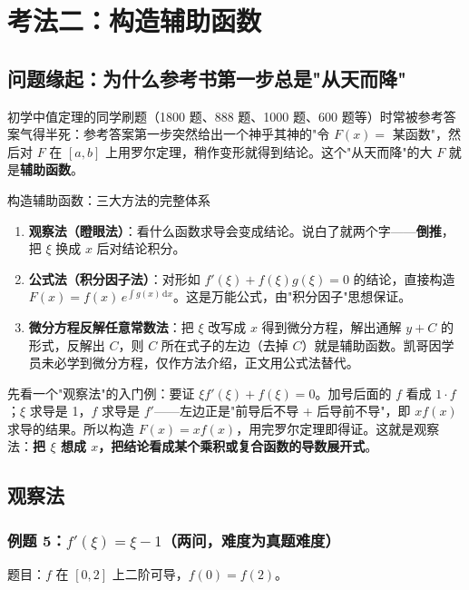 \documentclass[a4paper]{article}
\begin{document}
\section{考法二：构造辅助函数}

\subsection{问题缘起：为什么参考书第一步总是"从天而降"}

初学中值定理的同学刷题（1800 题、888 题、1000 题、600 题等）时常被参考答案气得半死：参考答案第一步突然给出一个神乎其神的"令 $F(x)=$ 某函数"，然后对 $F$ 在 $[a,b]$ 上用罗尔定理，稍作变形就得到结论。这个"从天而降"的大 $F$ 就是\textbf{辅助函数}。

\begin{importantbox}{构造辅助函数：三大方法的完整体系}
\begin{enumerate}
\item \textbf{观察法（瞪眼法）}：看什么函数求导会变成结论。说白了就两个字——\textbf{倒推}，把 $\xi$ 换成 $x$ 后对结论积分。
\item \textbf{公式法（积分因子法）}：对形如 $f'(\xi)+f(\xi)g(\xi)=0$ 的结论，直接构造 $F(x)=f(x)\,e^{\int g(x)\,\mathrm{d}x}$。这是万能公式，由"积分因子"思想保证。
\item \textbf{微分方程反解任意常数法}：把 $\xi$ 改写成 $x$ 得到微分方程，解出通解 $y+C$ 的形式，反解出 $C$，则 $C$ 所在式子的左边（去掉 $C$）就是辅助函数。凯哥因学员未必学到微分方程，仅作方法介绍，正文用公式法替代。
\end{enumerate}
\end{importantbox}

先看一个"观察法"的入门例：要证 $\xi f'(\xi)+f(\xi)=0$。加号后面的 $f$ 看成 $1\cdot f$；$\xi$ 求导是 1，$f$ 求导是 $f'$——左边正是"前导后不导 + 后导前不导"，即 $xf(x)$ 求导的结果。所以构造 $F(x)=xf(x)$，用完罗尔定理即得证。这就是观察法：\textbf{把 $\xi$ 想成 $x$，把结论看成某个乘积或复合函数的导数展开式}。

\subsection{观察法}

\subsubsection{例题 5：$f'(\xi)=\xi-1$（两问，难度为真题难度）}

题目：$f$ 在 $[0,2]$ 上二阶可导，$f(0)=f(2)$。
\end{document}
